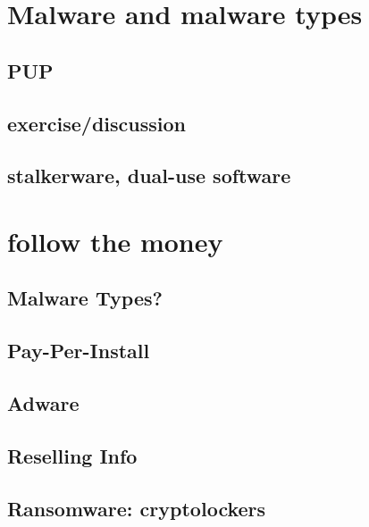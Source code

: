 


\section{Malware and malware types}


\subsection{PUP}


\subsection{exercise/discussion}


\subsection{stalkerware, dual-use software}


\section{follow the money}


\subsection{Malware Types?}


\subsection{Pay-Per-Install}


\subsection{Adware}


\subsection{Reselling Info}


\subsection{Ransomware: cryptolockers}


